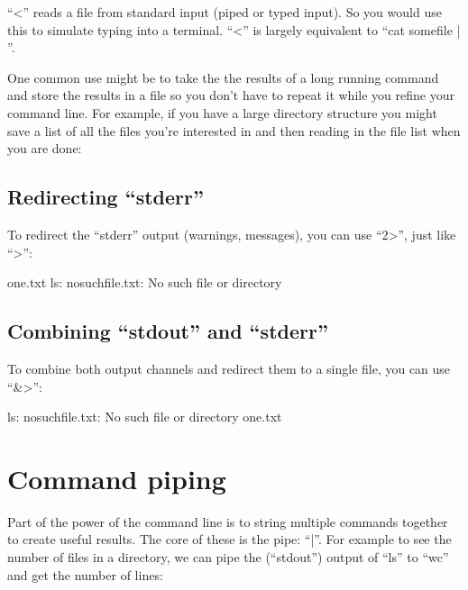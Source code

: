 ``<'' reads a file from standard input (piped or typed input).  So you would use
this to simulate typing into a terminal. ``<'' is largely equivalent to ``cat
somefile | ''.

One common use might be to take the the results of a long running command and
store the results in a file so you don't have to repeat it while you refine your
command line. For example, if you have a large directory structure you might
save a list of all the files you're interested in and then reading in the file
list when you are done:

\begin{prompt}
\end{prompt}

\subsection{Redirecting ``stderr''}

To redirect the ``stderr'' output (warnings, messages), you can use ``2>'', just
like ``>'':

\begin{prompt}
one.txt
ls: nosuchfile.txt: No such file or directory
\end{prompt}

\subsection{Combining ``stdout'' and ``stderr''}

To combine both output channels and redirect them to a single file, you can use
``\&>'':

\begin{prompt}
ls: nosuchfile.txt: No such file or directory
one.txt
\end{prompt}

\section{Command piping}

Part of the power of the command line is to string multiple commands together to
create useful results. The core of these is the pipe: ``|''. For example to see
the number of files in a directory, we can pipe the (``stdout'') output of
``ls'' to ``wc'' and get the number of lines:

